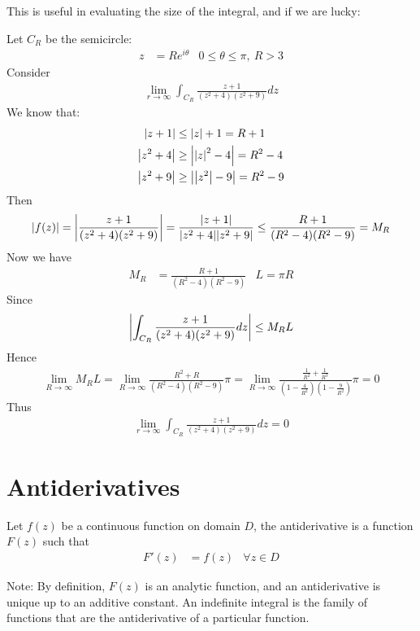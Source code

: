 \documentclass[12pt, english]{book}
\begin{document}
	This is useful in evaluating the size of the integral, and if we are lucky:

	\begin{example}
		Let \(C_R\) be the semicircle:
		\begin{align*}
			z &= Re^{i\theta} & 0 \leq \theta \leq \pi, \ R>3
		\end{align*}
		Consider 
		\begin{align*}
			\lim_{r \rightarrow \infty} \int_{C_R} \frac{z+1}{(z^2 + 4)(z^2 + 9)} dz 
		\end{align*}
		We know that:
		\begin{align*}
			\abs{z+1} &\leq \abs{z} + 1 = R + 1\\
			\abs{z^2 + 4} &\geq \abs{\abs{z}^2 - 4} = R^2 - 4\\
			\abs{z^2 + 9} &\geq \abs{\abs{z^2} - 9} = R^2 - 9
		\end{align*}
		Then 
		\begin{align*}
			\abs{f(z)} 
			= \abs{\frac{z+1}{(z^2 + 4)(z^2 + 9)}} = \frac{\abs{z+1}}{\abs{z^2 + 4} \abs{z^2 + 9}} 
			\leq \frac{R+1}{(R^2 - 4) (R^2 - 9)}  = M_R
		\end{align*}
		Now we have
		\begin{align*}
			M_R &= \frac{R+1}{(R^2 - 4) (R^2 - 9)} & L = \pi R
		\end{align*}
		Since
		\begin{align*}
			\abs{\int_{C_R} \frac{z+1}{(z^2 + 4)(z^2 + 9)} dz} \leq M_R L 
		\end{align*}
		Hence
		\begin{align*}
			\lim_{R \rightarrow \infty} M_R L 
			= \lim_{R \rightarrow \infty} \frac{R^2+R}{(R^2 - 4) (R^2 - 9)} \pi
			= \lim_{R \rightarrow \infty} \frac{\frac{1}{R^2} + \frac{1}{R^3}}{\left(1 - \frac{4}{R^2}\right) \left(1-\frac{9}{R^2}\right)} \pi
			= 0
		\end{align*}
		Thus
		\begin{align*}
			\lim_{r \rightarrow \infty} \int_{C_R} \frac{z+1}{(z^2 + 4)(z^2 + 9)} dz = 0
		\end{align*} 
	\end{example}
	
	\section{Antiderivatives} \label{Antiderivatives Section - Complex}
	
	\begin{definition}[Antiderivative]
		\label{Antiderivative Definition - Complex}
		Let \(f(z)\) be a continuous function on domain \(D\), the antiderivative is a function \(F(z)\) such that 
		\begin{align*}
			F'(z) &= f(z) & \forall z \in D
		\end{align*}
	\end{definition}
	Note: By definition, \(F(z)\) is an analytic function, and an antiderivative is unique up to an additive constant. An indefinite integral is the family of functions that are the antiderivative of a particular function. 
	
\end{document}
